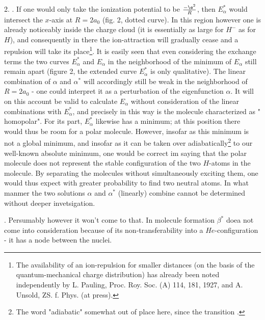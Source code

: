 \documentclass{article}
\begin{document}
2. . If one would only take the ionization potential to be $\frac{-\e^2}{R}$, then $E_\alpha^*$ would intersect the $x$-axis at $R=2a_0$ (fig. 2, dotted curve). In this region however one is already noticeably inside the charge cloud (it is essentially as large for $H^-$ as for $H$), and consequently in there the ion-attraction will gradually cease and a repulsion will take its place\footnote{The availability of an ion-repulsion for smaller distances (on the basis of the quantum-mechanical charge distribution) has already been noted independently by L. Pauling, Proc. Roy. Soc. (A) 114, 181, 1927, and A. Unsold, ZS. f. Phys. (at press).}. It is easily seen that even considering the exchange terms the two curves $E_\alpha^*$ and $E_\alpha$ in the neighborhood of the minimum of $E_\alpha$ still remain apart (figure 2, the extended curve $E_\alpha^*$ is only qualitative). The linear combination of $\alpha$ and $\alpha^*$ will accordingly still be weak in the neighborhood of $R=2a_0$ - one could interpret it as a perturbation of the eigenfunction $\alpha$. It will on this account be valid to calculate $E_\alpha$ without consideration of the linear combinations with $E_\alpha^*$, and precisely in this way is the molecule characterized as " homopolar". For its part, $E_\alpha^*$ likewise has a minimum; at this position there would thus be room for a polar molecule. However, insofar as this minimum is not a global minimum, and insofar as it can be taken over adiabatically\footnote{The word "adiabatic" somewhat out of place here, since the transition .} to our well-known absolute minimum, one would be correct im saying that the polar molecule does not represent the stable configuration of the two $H$-atoms in the molecule. By separating the molecules without simultaneously exciting them, one would thus expect with greater probability to find two neutral atoms. In what manmer the two solutions $\alpha$ and $\alpha^*$ (linearly) combine cannot be determined without deeper invetsigation.

. Persumably however it won't come to that. In molecule formation $\beta^*$ doea not come into consideration because of its non-transferability into a $He$-configuration - it has a node between the nuclei.
\end{document}
